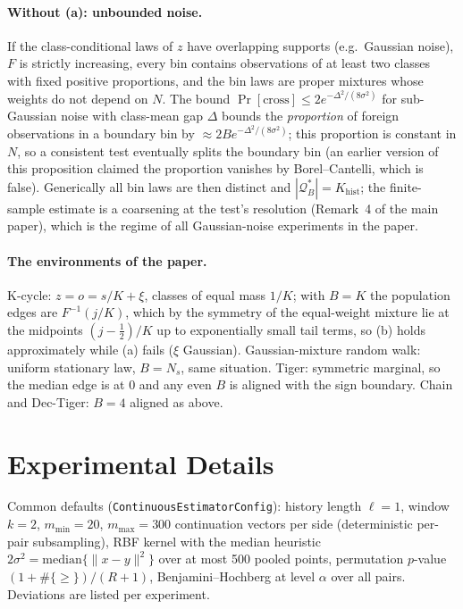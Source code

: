 \documentclass[10pt]{article}
\newcommand{\Qstar}{\mathcal{Q}^*}
\newcommand{\Khist}{K_{\mathrm{hist}}}
\begin{document}
\paragraph{Without (a): unbounded noise.}
If the class-conditional laws of $z$ have overlapping supports (e.g.\ Gaussian
noise), $F$ is strictly increasing, every bin contains observations of at least
two classes with fixed positive proportions, and the bin laws are proper
mixtures whose weights do not depend on $N$.  The bound
$\Pr[\text{cross}]\le2e^{-\Delta^2/(8\sigma^2)}$ for sub-Gaussian noise with
class-mean gap $\Delta$ bounds the \emph{proportion} of foreign observations
in a boundary bin by $\approx2Be^{-\Delta^2/(8\sigma^2)}$; this proportion is
constant in $N$, so a consistent test eventually splits the boundary bin (an
earlier version of this proposition claimed the proportion vanishes by
Borel--Cantelli, which is false).  Generically all bin laws are then distinct
and $|\Qstar_B|=\Khist$; the finite-sample estimate is a coarsening at the
test's resolution (Remark~4 of the main paper), which is the regime of all
Gaussian-noise experiments in the paper.

\paragraph{The environments of the paper.}
K-cycle: $z=o=s/K+\xi$, classes of equal mass $1/K$; with $B=K$ the population
edges are $F^{-1}(j/K)$, which by the symmetry of the equal-weight mixture lie
at the midpoints $(j-\tfrac12)/K$ up to exponentially small tail terms, so (b)
holds approximately while (a) fails ($\xi$ Gaussian).  Gaussian-mixture random
walk: uniform stationary law, $B=N_s$, same situation.  Tiger: symmetric
marginal, so the median edge is at $0$ and any even $B$ is aligned with the
sign boundary.  Chain and Dec-Tiger: $B=4$ aligned as above.

\section{Experimental Details}
\label{sec:envs}

Common defaults (\texttt{ContinuousEstimatorConfig}): history length
$\ell=1$, window $k=2$, $m_{\min}=20$, $m_{\max}=300$ continuation vectors per
side (deterministic per-pair subsampling), RBF kernel with the median heuristic
$2\sigma^2=\mathrm{median}\{\|x-y\|^2\}$ over at most 500 pooled points,
permutation $p$-value $(1+\#\{\ge\})/(R+1)$, Benjamini--Hochberg at level
$\alpha$ over all pairs.  Deviations are listed per experiment.
\end{document}
